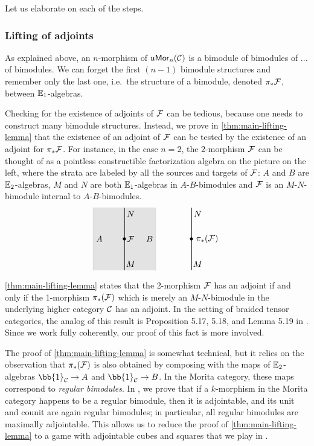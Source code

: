 \documentclass[10pt, reqno, twoside
, final
]{amsart}
\numberwithin{equation}{subsection}%
\theoremstyle{definition}
\theoremstyle{definition}
\theoremstyle{definition}
\theoremstyle{definition}
\theoremstyle{definition}
\theoremstyle{definition}
\theoremstyle{definition}
\theoremstyle{definition}
\theoremstyle{definition}
\theoremstyle{plain}
\theoremstyle{definition}
\theoremstyle{plain}
\theoremstyle{definition}
\theoremstyle{plain}
\theoremstyle{definition}
\theoremstyle{definition}
\theoremstyle{plain}
\theoremstyle{plain}
\theoremstyle{definition}
\theoremstyle{plain}
\theoremstyle{plain}
\theoremstyle{plain}
\begin{document}
Let us elaborate on each of the steps.

\subsubsection{Lifting of adjoints}

As explained above, an $n$-morphism of $\mathfrak{u}\mathsf{Mor}_n(\mathcal{C})$ is a bimodule of bimodules of ... of bimodules. We can forget the first $(n-1)$ bimodule structures and remember only the last one, i.e.~the structure of a bimodule, denoted $\pi_*\mathcal{F}$, between $\mathbb{E}_1$-algebras.

Checking for the existence of adjoints of $\mathcal{F}$ can be tedious, because one needs to construct many bimodule structures.
Instead, we prove in \cref{thm:main-lifting-lemma} that the existence of an adjoint of $\mathcal{F}$ can be tested by the existence of an adjoint for $\pi_*\mathcal{F}$. For instance, in the case $n=2$, the $2$-morphism $\mathcal{F}$ can be thought of as a pointless constructible factorization algebra on the picture on the left, where the strata are labeled by all the sources and targets of $\mathcal{F}$: $A$ and $B$ are $\mathbb{E}_2$-algebras, $M$ and $N$ are both $\mathbb{E}_1$-algebras in $A$-$B$-bimodules and $\mathcal{F}$ is an $M$-$N$-bimodule internal to $A$-$B$-bimodules.
\begin{equation*}
\begin{tikzpicture}[scale=1.3]
\filldraw[opacity=0.1] (1,0) -- (0,0) -- (0,2)--(1,2);
\filldraw[opacity=0.1] (1,0) -- (2,0) -- (2,2)--(1,2);
\draw[thick] (1,0) -- (1,2);
\fill (1,1) circle (0.05);
\node at (1.2,0.2) {$M$};
\node at (1.2,1.8) {$N$};
\node at (1.2,1) {$\F$};
\node at (0.2,1) {$A$};
\node at (1.8,1) {$B$};
\end{tikzpicture} \qquad \qquad\begin{tikzpicture}[scale=1.3]
\draw[thick] (1,0) -- (1,2);
\fill (1,1) circle (0.05);
\node at (1.2,0.2) { $M$};
\node at (1.2,1.8) {$N$};
\node at (1.5,1) {$\pi_*(\F)$};
\end{tikzpicture} 
\end{equation*}
\cref{thm:main-lifting-lemma} states that the 2-morphism $\mathcal{F}$ has an adjoint if and only if the 1-morphism $\pi_*(\mathcal{F})$ which is merely an $M$-$N$-bimodule in the underlying higher category $\mathcal{C}$ has an adjoint. In the setting of braided tensor categories, the analog of this result is Proposition 5.17, 5.18, and Lemma 5.19 in \cite{BJS}. Since we work fully coherently, our proof of this fact is more involved. 



The proof of \cref{thm:main-lifting-lemma} is somewhat technical, but it relies on the observation that $\pi_*(\mathcal{F})$ is also obtained by composing with the maps of $\mathbb{E}_2$-algebras $\bb{1}_{\icat}\rightarrow A$ and $\bb{1}_{\icat}\rightarrow B$. In the Morita category, these maps correspond to \emph{regular bimodules}. In  , we prove that if a $k$-morphism in the Morita category happens to be a regular bimodule, then it is adjointable, and its unit and counit are again regular bimodules; in particular, all regular bimodules are maximally adjointable. This allows us to reduce the proof of  \cref{thm:main-lifting-lemma} to a game with adjointable cubes and squares that we play in  .
\end{document}
